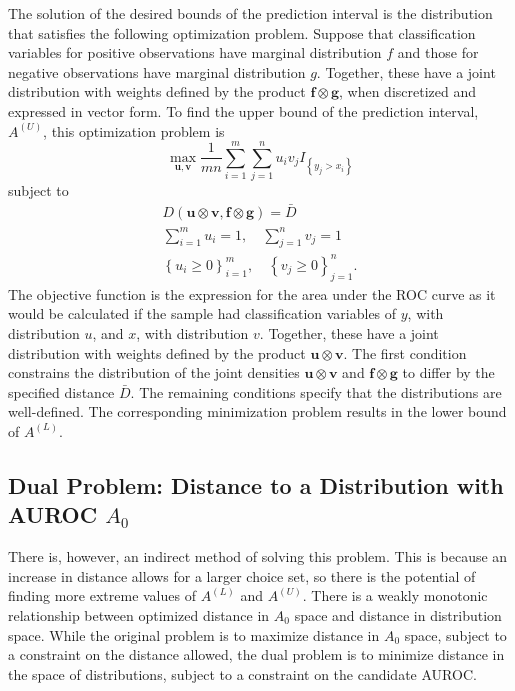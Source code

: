 The solution of the desired bounds of the prediction interval is the distribution that satisfies the following optimization problem.
Suppose that classification variables for positive observations have marginal distribution $f$ and those for negative observations have marginal distribution $g$.
Together, these have a joint distribution with weights defined by the product $\mathbf{f} \otimes \mathbf{g}$, when discretized and expressed in vector form.
%
To find the upper bound of the prediction interval, $A^{(U)}$, this optimization problem is
%
\begin{equation}
    \max_{\mathbf{u}, \mathbf{v}} \frac{1}{m n} \sum_{i = 1}^{m} \sum_{j = 1}^{n} u_i v_j I_{\left\{ y_j > x_i \right\}}
\end{equation}
%
\noindent subject to
\begin{align}
    D(\mathbf{u} \otimes \mathbf{v}, \mathbf{f} \otimes \mathbf{g}) = \bar{D} \\
    \sum_{i = 1}^{m} u_i = 1, \quad \sum_{j = 1}^{n} v_j = 1 \\
    \left\{ u_i  \geq 0 \right\}_{i=1}^{m}, \quad \left\{ v_j \geq 0 \right\}_{j=1}^{n}.
\end{align}
%
\noindent The objective function is the expression for the area under the ROC curve as it would be calculated if the sample had classification variables of $y$, with distribution $u$, and $x$, with distribution $v$.
Together, these have a joint distribution with weights defined by the product $\mathbf{u} \otimes \mathbf{v}$.
The first condition constrains the distribution of the joint densities $\mathbf{u} \otimes \mathbf{v}$ and $\mathbf{f} \otimes \mathbf{g}$ to differ by the specified distance $\bar{D}$.
%
The remaining conditions specify that the distributions are well-defined.
%
The corresponding minimization problem results in the lower bound of $A^{(L)}$.


\subsection{Dual Problem: Distance to a Distribution with AUROC $A_0$}

There is, however, an indirect method of solving this problem.
This is because an increase in distance allows for a larger choice set, so there is the potential of finding more extreme values of $A^{(L)}$ and  $A^{(U)}$.
%
%
There is a weakly monotonic relationship between optimized distance in $A_0$ space and distance in distribution space.
While the original problem is to maximize distance in $A_0$ space, subject to a constraint on the distance allowed,
the dual problem is to minimize distance in the space of distributions, subject to a constraint on the candidate AUROC.



